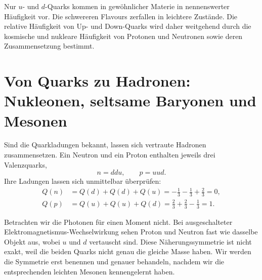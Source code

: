 \begin{classroomqa}
\end{classroomqa}

Nur \(u\)- und \(d\)-Quarks kommen in gewöhnlicher Materie in nennenswerter Häufigkeit vor. Die schwereren Flavours zerfallen in leichtere Zustände. Die relative Häufigkeit von Up- und Down-Quarks wird daher weitgehend durch die kosmische und nukleare Häufigkeit von Protonen und Neutronen sowie deren Zusammensetzung bestimmt.

\begin{classroomqa}
\end{classroomqa}

\section{Von Quarks zu Hadronen: Nukleonen, seltsame Baryonen und Mesonen}

Sind die Quarkladungen bekannt, lassen sich vertraute Hadronen zusammensetzen. Ein Neutron und ein Proton enthalten jeweils drei Valenzquarks,
\begin{equation}
n=ddu,
\qquad
p=uud.
\end{equation}
Ihre Ladungen lassen sich unmittelbar überprüfen:
\begin{align}
Q(n) &= Q(d)+Q(d)+Q(u)
= -\frac13-\frac13+\frac23
=0,\\
Q(p) &= Q(u)+Q(u)+Q(d)
= \frac23+\frac23-\frac13
=1.
\end{align}

Betrachten wir die Photonen für einen Moment nicht. Bei ausgeschalteter Elektromagnetismus-Wechselwirkung sehen Proton und Neutron fast wie dasselbe Objekt aus, wobei \(u\) und \(d\) vertauscht sind. Diese Näherungssymmetrie ist nicht exakt, weil die beiden Quarks nicht genau die gleiche Masse haben. Wir werden die Symmetrie erst benennen und genauer behandeln, nachdem wir die entsprechenden leichten Mesonen kennengelernt haben.

